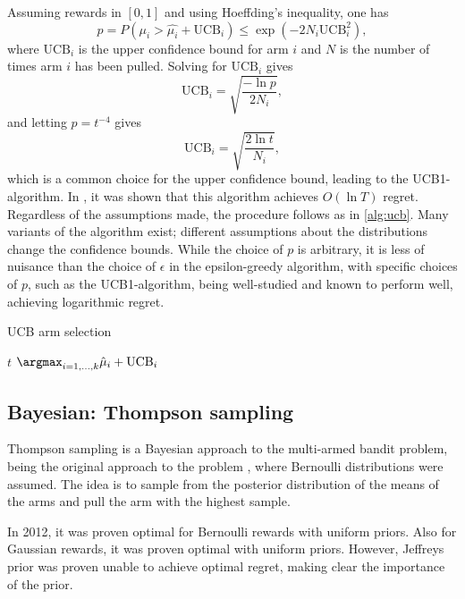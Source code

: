 Assuming rewards in $[0,1]$ and using Hoeffding's inequality, one has
\begin{equation}
    p
    = P \left(\mu_i > \hat{\mu_i} + \text{UCB}_i \right)
    \leq \exp \left(-2N_i \text{UCB}_i^2 \right),
\end{equation}
where $\text{UCB}_i$ is the upper confidence bound for arm $i$ and $N$ is the number of times arm $i$ has been pulled.
Solving for $\text{UCB}_i$ gives
\begin{equation}
    \text{UCB}_i = \sqrt{\frac{-\ln p}{2N_i}},
\end{equation}
and letting $p = t^{-4}$ gives
\begin{equation}
    \text{UCB}_i = \sqrt{\frac{2 \ln t}{N_i}},
\end{equation}
which is a common choice for the upper confidence bound, leading to the UCB1-algorithm.
In \cite{auer2002}, it was shown that this algorithm achieves $O(\ln T)$ regret.
Regardless of the assumptions made, the procedure follows as in \cref{alg:ucb}.
Many variants of the algorithm exist; different assumptions about the distributions change the confidence bounds.
While the choice of $p$ is arbitrary, it is less of nuisance than the choice of $\epsilon$ in the epsilon-greedy algorithm, with specific choices of $p$, such as the UCB1-algorithm, being well-studied and known to perform well, achieving logarithmic regret.

\begin{algorithm}
    \caption{UCB arm selection}
    \label{alg:ucb}
    \begin{algorithmic}
        \State \Return $t$
        \Else
        \State \Return $\argmax_{i=1,\dots,k} \hat{\mu}_i + \text{UCB}_i$
        \EndIf
    \end{algorithmic}
\end{algorithm}


\subsection{Bayesian: Thompson sampling}
Thompson sampling is a Bayesian approach to the multi-armed bandit problem, being the original approach to the problem \cite{thompson1933}, where Bernoulli distributions were assumed.
The idea is to sample from the posterior distribution of the means of the arms and pull the arm with the highest sample.

In 2012, it was proven optimal for Bernoulli rewards \cite{kaufmann2012} with uniform priors.
Also for Gaussian rewards, it was proven optimal \cite{honda2014} with uniform priors.
However, Jeffreys prior was proven unable to achieve optimal regret, making clear the importance of the prior.
